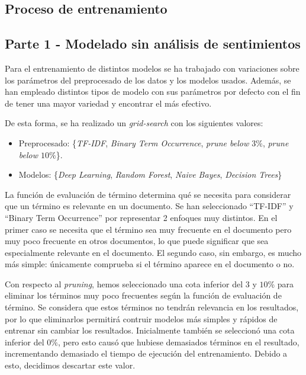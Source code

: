 \documentclass[es]{uc3mreport}
\begin{document}
\begin{report}
\section{Proceso de entrenamiento}
\label{chap:train}

\subsection{Parte 1 - Modelado sin análisis de sentimientos}
\label{sec:parte1}

    Para el entrenamiento de distintos modelos se ha trabajado con variaciones
    sobre los parámetros del preprocesado de los datos y los modelos usados.
    Además, se han empleado distintos tipos de modelo con sus
    parámetros por defecto con el fin de tener una mayor variedad y encontrar
    el más efectivo.

    De esta forma, se ha realizado un \textit{grid-search} con los siguientes valores:
    \begin{itemize}
        \item Preprocesado: \{\textit{TF-IDF}, \textit{Binary Term Occurrence}, \textit{prune below $3\%$}, \textit{prune below $10\%$}\}.
        \item Modelos: \{\textit{Deep Learning}, \textit{Random Forest}, \textit{Naive Bayes}, \textit{Decision Trees}\}
    \end{itemize}

    La función de evaluación de término determina qué se necesita para considerar
    que un término es relevante en un documento. Se han seleccionado ``TF-IDF'' y
    ``Binary Term Occurrence'' por representar 2 enfoques muy distintos. En el
    primer caso se necesita que el término sea muy frecuente en el documento pero
    muy poco frecuente en otros documentos, lo que puede significar que sea especialmente
    relevante en el documento. El segundo caso, sin embargo, es mucho más simple:
    únicamente comprueba si el término aparece en el documento o no.

    Con respecto al \textit{pruning}, hemos seleccionado una cota inferior del $3$ y $10$\%
    para eliminar los términos muy poco frecuentes según la función de evaluación
    de término. Se considera que estos términos no tendrán relevancia en los
    resultados, por lo que eliminarlos permitirá contruir modelos más simples y
    rápidos de entrenar sin cambiar los resultados. Inicialmente también se
    seleccionó una cota inferior del $0\%$, pero esto causó que hubiese demasiados
    términos en el resultado, incrementando demasiado el tiempo de ejecución del
    entrenamiento. Debido a esto, decidimos descartar este valor.


\end{report}
\end{document}
